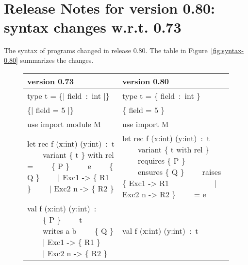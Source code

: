 \documentclass[a4paper,11pt,twoside,openright]{memoir}
\makeatletter
\let\ttfamily\relax
\DeclareRobustCommand\ttfamily
   {\not@math@alphabet\ttfamily\mathtt\fontfamily\ttdefault\selectfont\frenchspacing}
\makeatother
\begin{document}
\section{Release Notes for version 0.80: syntax changes w.r.t. 0.73}

The syntax of \whyml programs changed in release 0.80.
The table in Figure~\ref{fig:syntax-0.80} summarizes the changes.

\begin{figure}[thbp]
  \centering
\begin{tabular}{|p{}|p{}|}
\hline
\textbf{version 0.73} & \textbf{version 0.80} \\
\hline
\ttfamily
type t = \{| field~:~int |\}
&
\ttfamily
type t = \{ field~:~int \}
\\
\hline
\ttfamily
\{| field = 5 |\}
&
\ttfamily
\{ field = 5 \}
\\
\hline
\ttfamily
use import module M
&
\ttfamily
use import M
\\
\hline
\ttfamily
let rec f (x:int) (y:int)~:~t \newline
\null~~~~variant \{ t \} with rel = \newline
\null~~~~\{ P \} \newline
\null~~~~e \newline
\null~~~~\{ Q \} \newline
\null~~~~| Exc1 -> \{ R1 \} \newline
\null~~~~| Exc2 n -> \{ R2 \}
&
\ttfamily
let rec f (x:int) (y:int)~:~t \newline
\null~~~~variant \{ t with rel \} \newline
\null~~~~requires \{ P \} \newline
\null~~~~ensures \{ Q \} \newline
\null~~~~raises \{ Exc1 -> R1 \newline
\null~~~~~~~~~~~| Exc2 n -> R2 \} \newline
\null~~~~= e
\\
\hline
\ttfamily
val f (x:int) (y:int)~:\newline
\null~~~~\{ P \} \newline
\null~~~~t \newline
\null~~~~writes a b \newline
\null~~~~\{ Q \} \newline
\null~~~~| Exc1 -> \{ R1 \} \newline
\null~~~~| Exc2 n -> \{ R2 \}
&
\ttfamily
val f (x:int) (y:int)~:~t \newline

\end{tabular}
\end{figure}
\end{document}
